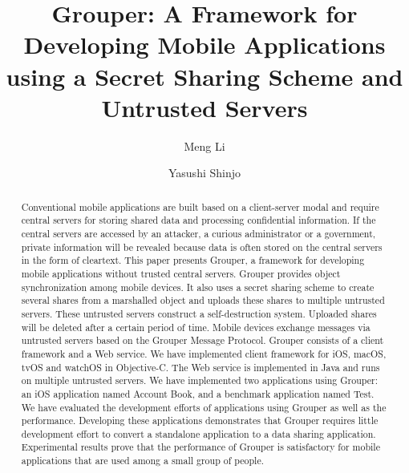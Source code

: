 \documentclass[sigconf]{acmart}
\begin{document}
\title{Grouper: A Framework for Developing Mobile Applications using a Secret Sharing Scheme and Untrusted Servers}

\author{Meng Li}

\author{Yasushi Shinjo}

\renewcommand{\shortauthors}{Li et al.}

\begin{abstract}
	
Conventional mobile applications are built based on a client-server modal and require central servers for storing shared data and processing confidential information.
If the central servers are accessed by an attacker, a curious administrator or a government, private information will be revealed because data is often stored on the central servers in the form of cleartext.
This paper presents Grouper, a framework for developing mobile applications without trusted central servers.
Grouper provides object synchronization among mobile devices.
It also uses a secret sharing scheme to create several shares from a marshalled object and uploads these shares to multiple untrusted servers. 
These untrusted servers construct a self-destruction system.
Uploaded shares will be deleted after a certain period of time.
Mobile devices exchange messages via untrusted servers based on the Grouper Message Protocol.
Grouper consists of a client framework and a Web service.
We have implemented client framework for iOS, macOS, tvOS and watchOS in Objective-C.
The Web service is implemented in Java and runs on multiple untrusted servers.
We have implemented two applications using Grouper: an iOS application named Account Book, and a benchmark application named Test.
We have evaluated the development efforts of applications using Grouper as well as the performance. 
Developing these applications demonstrates that Grouper requires little development effort to convert a standalone application to a data sharing application.
Experimental results prove that the performance of Grouper is satisfactory for mobile applications that are used among a small group of people.

\end{abstract}


\maketitle
\end{document}
